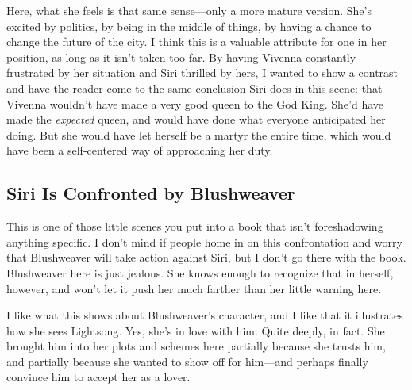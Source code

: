 Here, what she feels is that same sense—only a more mature version. She’s excited by politics, by being in the middle of things, by having a chance to change the future of the city. I think this is a valuable attribute for one in her position, as long as it isn’t taken too far. By having Vivenna constantly frustrated by her situation and Siri thrilled by hers, I wanted to show a contrast and have the reader come to the same conclusion Siri does in this scene: that Vivenna wouldn’t have made a very good queen to the God King. She’d have made the \textit{expected} queen, and would have done what everyone anticipated her doing. But she would have let herself be a martyr the entire time, which would have been a self-centered way of approaching her duty.

\subsection*{Siri Is Confronted by Blushweaver}

This is one of those little scenes you put into a book that isn’t foreshadowing anything specific. I don’t mind if people home in on this confrontation and worry that Blushweaver will take action against Siri, but I don’t go there with the book. Blushweaver here is just jealous. She knows enough to recognize that in herself, however, and won’t let it push her much farther than her little warning here.

I like what this shows about Blushweaver’s character, and I like that it illustrates how she sees Lightsong. Yes, she’s in love with him. Quite deeply, in fact. She brought him into her plots and schemes here partially because she trusts him, and partially because she wanted to show off for him—and perhaps finally convince him to accept her as a lover.



